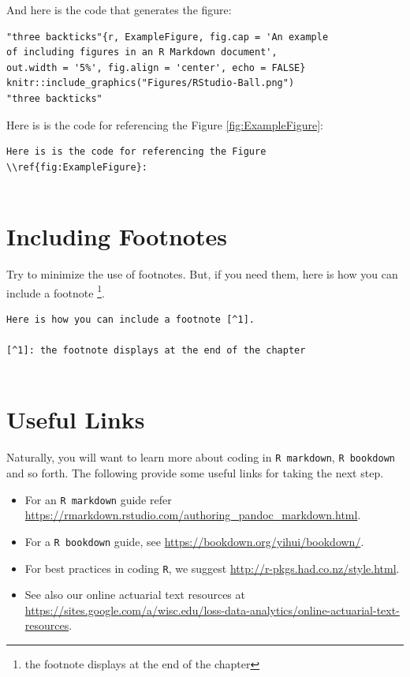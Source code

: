 \documentclass[]{book}
\let\rmarkdownfootnote\footnote%
\def\footnote{\protect\rmarkdownfootnote}
\theoremstyle{definition}
\theoremstyle{definition}
\theoremstyle{definition}
\theoremstyle{remark}
\begin{document}
And here is the code that generates the figure:

\begin{verbatim}
"three backticks"{r, ExampleFigure, fig.cap = 'An example 
of including figures in an R Markdown document', 
out.width = '5%', fig.align = 'center', echo = FALSE}
knitr::include_graphics("Figures/RStudio-Ball.png")
"three backticks"
\end{verbatim}

Here is is the code for referencing the Figure \ref{fig:ExampleFigure}:

\begin{verbatim}
Here is is the code for referencing the Figure \\ref{fig:ExampleFigure}:
    
\end{verbatim}

\section{Including Footnotes}\label{including-footnotes}

Try to minimize the use of footnotes. But, if you need them, here is how
you can include a footnote \footnote{the footnote displays at the end of
  the chapter}.

\begin{verbatim}
Here is how you can include a footnote [^1].
    
[^1]: the footnote displays at the end of the chapter
    
\end{verbatim}

\section{Useful Links}\label{S:Links}

Naturally, you will want to learn more about coding in
\texttt{R\ markdown}, \texttt{R\ bookdown} and so forth. The following
provide some useful links for taking the next step.

\begin{itemize}
\item
  For an \texttt{R\ markdown} guide refer
  \url{https://rmarkdown.rstudio.com/authoring_pandoc_markdown.html}.
\item
  For a \texttt{R\ bookdown} guide, see
  \url{https://bookdown.org/yihui/bookdown/}.
\item
  For best practices in coding \texttt{R}, we suggest
  \url{http://r-pkgs.had.co.nz/style.html}.
\item
  See also our online actuarial text resources at
  \url{https://sites.google.com/a/wisc.edu/loss-data-analytics/online-actuarial-text-resources}.
\end{itemize}
\end{document}
